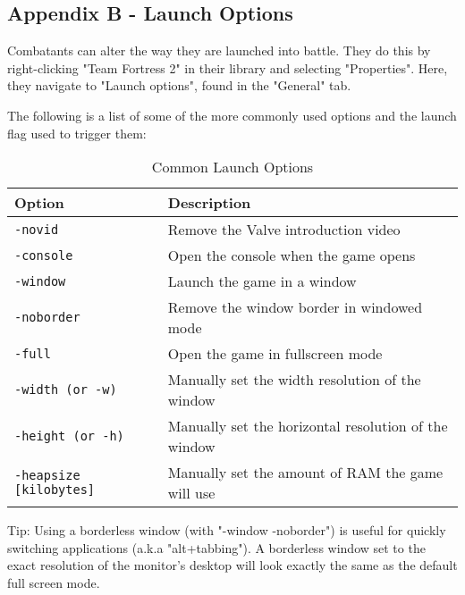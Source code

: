 \subsection{Appendix B - Launch Options}
Combatants can alter the way they are launched into battle. They do this by right-clicking "Team Fortress 2" in their library and selecting "Properties". Here, they navigate to "Launch options", found in the "General" tab.

The following is a list of some of the more commonly used options and the launch flag used to trigger them:

\begin{table}[h!b!p!]
\caption{Common Launch Options}
\begin{tabular}{|l|p{10.5cm}|}
	\hline
		Option & Description\\
	\hline
	\texttt{-novid}&Remove the Valve introduction video\\
	\texttt{-console}&Open the console when the game opens\\
	\texttt{-window}&Launch the game in a window\\
	\texttt{-noborder}&Remove the window border in windowed mode\\
	\texttt{-full}&Open the game in fullscreen mode\\
	\texttt{-width (or -w)}&Manually set the width resolution of the window\\
	\texttt{-height (or -h)}&Manually set the horizontal resolution of the window\\
	\texttt{-heapsize [kilobytes]}&Manually set the amount of RAM the game will use\\

  	\hline
\end{tabular}
\label{table_launch_options}
\end{table}

Tip: Using a borderless window (with "-window -noborder") is useful for quickly switching applications (a.k.a "alt+tabbing").  A borderless window set to the exact resolution of the monitor's desktop will look exactly the same as the default full screen mode.